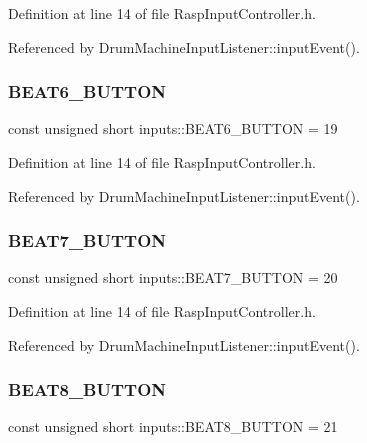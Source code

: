 Definition at line 14 of file Rasp\+Input\+Controller.\+h.



Referenced by Drum\+Machine\+Input\+Listener\+::input\+Event().

\mbox{\label{namespaceinputs_a6afdc23bce21454342081cf937e47ab9}} 
\subsubsection{\texorpdfstring{B\+E\+A\+T6\+\_\+\+B\+U\+T\+T\+ON}{BEAT6\_BUTTON}}
{\footnotesize\ttfamily const unsigned short inputs\+::\+B\+E\+A\+T6\+\_\+\+B\+U\+T\+T\+ON = 19}



Definition at line 14 of file Rasp\+Input\+Controller.\+h.



Referenced by Drum\+Machine\+Input\+Listener\+::input\+Event().

\mbox{\label{namespaceinputs_ac74e302394a578b31f0cf44df8cbb1a9}} 
\subsubsection{\texorpdfstring{B\+E\+A\+T7\+\_\+\+B\+U\+T\+T\+ON}{BEAT7\_BUTTON}}
{\footnotesize\ttfamily const unsigned short inputs\+::\+B\+E\+A\+T7\+\_\+\+B\+U\+T\+T\+ON = 20}



Definition at line 14 of file Rasp\+Input\+Controller.\+h.



Referenced by Drum\+Machine\+Input\+Listener\+::input\+Event().

\mbox{\label{namespaceinputs_abfcd4d28221c436391131a27402ea620}} 
\subsubsection{\texorpdfstring{B\+E\+A\+T8\+\_\+\+B\+U\+T\+T\+ON}{BEAT8\_BUTTON}}
{\footnotesize\ttfamily const unsigned short inputs\+::\+B\+E\+A\+T8\+\_\+\+B\+U\+T\+T\+ON = 21}



